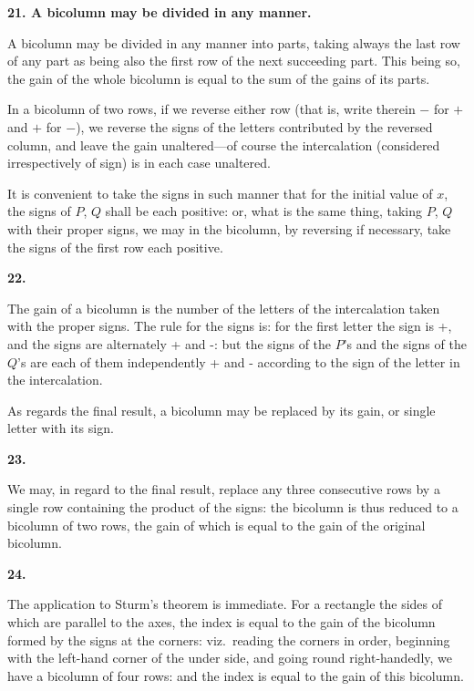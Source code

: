 \documentclass[12pt,a4paper]{article}
\theoremstyle{plain}
\theoremstyle{definition}
\begin{document}
\newpage
\setcounter{page}{29}

\textbf{21. A bicolumn may be divided in any manner.}

A bicolumn may be divided in any manner into parts, taking always the last row of any part as being also the first row of the next succeeding part. This being so, the gain of the whole bicolumn is equal to the sum of the gains of its parts.

In a bicolumn of two rows, if we reverse either row (that is, write therein $-$ for $+$ and $+$ for $-$), we reverse the signs of the letters contributed by the reversed column, and leave the gain unaltered---of course the intercalation (considered irrespectively of sign) is in each case unaltered.

It is convenient to take the signs in such manner that for the initial value of $x$, the signs of $P$, $Q$ shall be each positive: or, what is the same thing, taking $P$, $Q$ with their proper signs, we may in the bicolumn, by reversing if necessary, take the signs of the first row each positive.

\textbf{22.}

The gain of a bicolumn is the number of the letters of the intercalation taken with the proper signs. The rule for the signs is: for the first letter the sign is +, and the signs are alternately + and -: but the signs of the $P$'s and the signs of the $Q$'s are each of them independently + and - according to the sign of the letter in the intercalation.

As regards the final result, a bicolumn may be replaced by its gain, or single letter with its sign.

\textbf{23.}

We may, in regard to the final result, replace any three consecutive rows by a single row containing the product of the signs: the bicolumn is thus reduced to a bicolumn of two rows, the gain of which is equal to the gain of the original bicolumn.

\newpage
\setcounter{page}{30}

\textbf{24.}

The application to Sturm's theorem is immediate. For a rectangle the sides of which are parallel to the axes, the index is equal to the gain of the bicolumn formed by the signs at the corners: viz.\ reading the corners in order, beginning with the left-hand corner of the under side, and going round right-handedly, we have a bicolumn of four rows: and the index is equal to the gain of this bicolumn.
\end{document}
